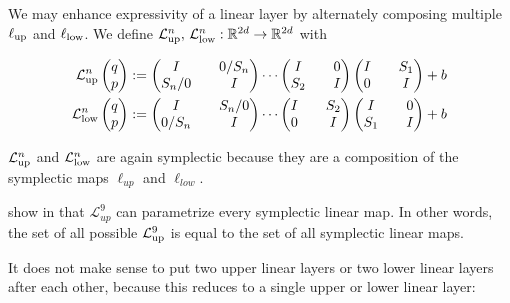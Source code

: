 \documentclass[twoside,a4paper]{article}
\begin{document}
We may enhance expressivity of a linear layer by alternately composing multiple
$\ell_{\text{up}}$ and $\ell_{\text{low}}$. We define 
$\mathcal{L}^{n}_{\text{up}},\, \mathcal{L}^{n}_{\text{low}} : \mathbb{R}^{2d} \to \mathbb{R}^{2d}$ with

\begin{align*}
	\mathcal{L}^{n}_{\text{up}} \begin{pmatrix} q \\ p \end{pmatrix} &:= \begin{pmatrix}
		I && 0 / S_n \\
		S_n / 0 && I
	\end{pmatrix}
	\cdots
	\begin{pmatrix}
		I && 0 \\
		S_2 && I
	\end{pmatrix}
	\begin{pmatrix}
		I && S_1 \\
		0 && I
	\end{pmatrix} + b \\
	\mathcal{L}^{n}_{\text{low}} \begin{pmatrix} q \\ p \end{pmatrix} &:= \begin{pmatrix}
		I && S_n / 0 \\
		0 / S_n && I
	\end{pmatrix}
	\cdots
	\begin{pmatrix}
		I && S_2 \\
		0 && I
	\end{pmatrix}
	\begin{pmatrix}
		I && 0 \\
		S_1 && I
	\end{pmatrix} + b
\end{align*}

$\mathcal{L}^{n}_{\text{up}}$ and $\mathcal{L}^{n}_{\text{low}}$ are again symplectic because they 
are a composition of the symplectic maps $\ell_{up}$ and $\ell_{low}$.

\citeauthor{jin2020unit} show in \cite{jin2020unit} that $\mathcal{L}^{9}_{up}$
can parametrize every symplectic linear map. In other words, 
the set of all possible $\mathcal{L}^{9}_{\text{up}}$ is equal to the set of all symplectic linear maps.

It does not make sense to put two upper linear layers or two lower linear layers after each other,
because this reduces to a single upper or lower linear layer:
\end{document}
